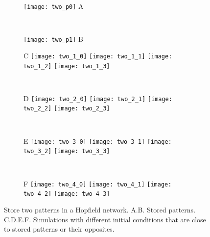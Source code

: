 \vfill

\begin{figure}[H]
  \centering
  \begin{minipage}{0.275\textwidth}
    \begin{subfigure}{\textwidth}
      \centering
      \texttt{[image: two\_p0]}
      \textsf{A}
    \end{subfigure}\\[0.3em]
    \begin{subfigure}{\textwidth}
      \centering
      \texttt{[image: two\_p1]}
      \textsf{B}
    \end{subfigure}
  \end{minipage}
  \hspace{0.7em}
  \begin{minipage}{0.62\textwidth}
    \begin{subfigure}{\textwidth}
      \textsf{C}
      \centering
      \texttt{[image: two\_1\_0]}
      \texttt{[image: two\_1\_1]}
      \texttt{[image: two\_1\_2]}
      \texttt{[image: two\_1\_3]}
    \end{subfigure}\\[0.8em]
    \begin{subfigure}{\textwidth}
      \textsf{D}
      \centering
      \texttt{[image: two\_2\_0]}
      \texttt{[image: two\_2\_1]}
      \texttt{[image: two\_2\_2]}
      \texttt{[image: two\_2\_3]}
    \end{subfigure}\\[0.8em]
    \begin{subfigure}{\textwidth}
      \textsf{E}
      \centering
      \texttt{[image: two\_3\_0]}
      \texttt{[image: two\_3\_1]}
      \texttt{[image: two\_3\_2]}
      \texttt{[image: two\_3\_3]}
    \end{subfigure}\\[0.8em]
    \begin{subfigure}{\textwidth}
      \textsf{F}
      \centering
      \texttt{[image: two\_4\_0]}
      \texttt{[image: two\_4\_1]}
      \texttt{[image: two\_4\_2]}
      \texttt{[image: two\_4\_3]}
    \end{subfigure}
  \end{minipage}
  \vspace{1.2em}
  \caption{Store two patterns in a Hopfield network.
           \textsf{A.B.} Stored patterns.
           \textsf{C.D.E.F.} Simulations with different initial conditions
           that are close to stored patterns or their opposites.}
  \label{fig: Hopfield_two}
\end{figure}
\vfill

